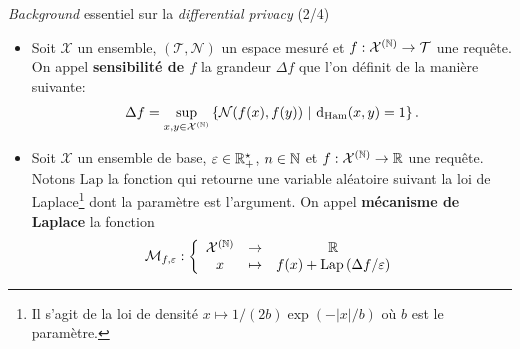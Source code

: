 \documentclass[10pt,serif]{beamer}
\begin{document}
  \begin{frame}{\textit{Background} essentiel sur la \textit{differential privacy} (2/4)}
    \begin{itemize}
      \item<1-> \begin{definition}
        Soit \(\mathcal X\) un ensemble, \((\mathcal T, \mathcal N)\) un espace mesuré et \(f : \mathcal X^{(\mathbb{N})} \to \mathcal T\) une requête. On appel \textbf{sensibilité de \(f\)} la grandeur \(\Delta f\) que l'on définit de la manière suivante:
        \[
            \Delta f = \underset{x, y \in \mathcal X^{(\N)}}{\sup} \left\{ \mathcal N(f(x), f(y)) \ | \ \dt_{\text{Ham}}(x,y) = 1 \right\}. 
        \]
      \end{definition}

      \vspace{-0.5cm}
      \item<2-> \begin{definition}
        Soit \(\mathcal X\) un ensemble de base, \(\varepsilon \in \mathbb{R}_+^\star\), \(n \in \mathbb{N}\) et \(f : \mathcal X^{(\mathbb{N})} \to \mathbb{R}\) une requête. Notons \(\text{Lap}\) la fonction qui retourne une variable aléatoire suivant la loi de {\sc Laplace}\footnote{Il s'agit de la loi de densité \(x \mapsto 1/(2b) \exp(-|x|/b)\) où \(b\) est le paramètre.} dont la paramètre est l'argument. On appel \textbf{mécanisme de {\sc Laplace}} la fonction 
        \[
            \mathcal M_{f,\varepsilon} : \left\{ 
                \begin{array}{ccc}
                    \mathcal X^{(\mathbb{N})} & \to & \mathbb{R}\\
                    x & \mapsto & f(x) + \text{Lap}\left( {\Delta f}/{\varepsilon} \right)
                \end{array}
            \right.    
        \]
      \end{definition}
    \end{itemize}
  \end{frame}
\end{document}
